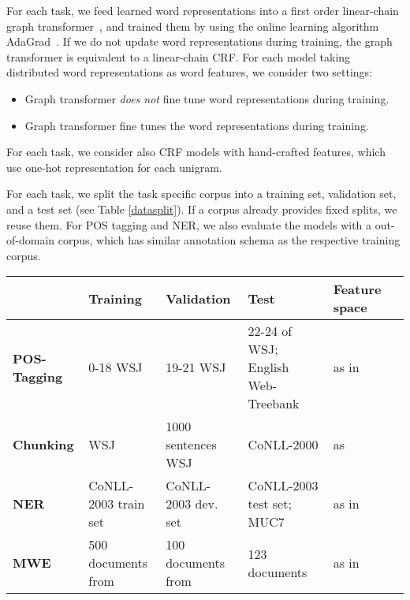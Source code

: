 For each task, we feed learned word representations into a first order linear-chain graph transformer~\cite{collobert2011natural}, and trained them by using the online learning algorithm AdaGrad~\cite{duchi2011adaptive}. If we do not update word representations during training, the graph transformer is equivalent to a linear-chain CRF. For each model taking distributed word representations as word features, we consider two settings: 
\begin{small}
\begin{itemize}
\item[-] Graph transformer \textit{does not} fine tune word representations during training.
\item[-] Graph transformer fine tunes the word representations during training.
\end{itemize}
\end{small}
For each task, we consider also CRF models with hand-crafted features, which use one-hot representation for each unigram.

For each task, we split the task specific corpus into a training set, validation set, and a test set (see Table \ref{datasplit}). If a corpus already provides fixed splits, we reuse them. For POS tagging and NER, we also evaluate the models with a out-of-domain corpus, which has similar annotation schema as the respective training corpus.
\begin{table*}
\begin{small}
\begin{tabular}{lllp{3cm}ll}
\hline
			& \textbf{Training} & \textbf{Validation} & \textbf{Test} & \textbf{Feature space} \\ \hline
\textbf{POS-Tagging} & 0-18 WSJ & 19-21 WSJ & 22-24 of WSJ; English Web-Treebank & as in~\cite{collobert2011natural} \\
\textbf{Chunking} & WSJ & 1000 sentences WSJ & CoNLL-2000 & as~\cite{turian2010word}\\
\textbf{NER} & CoNLL-2003 train set & CoNLL-2003 dev. set & CoNLL-2003 test set; MUC7 & as in~\cite{turian2010word} \\
\textbf{MWE} & 500 documents from & 100 documents from & 123 documents & as in~\cite{mwecorpus}\\
\hline
\end{tabular}
\caption{Datasets and features for each task}
\label{datasplit}
\end{small}
\end{table*}


